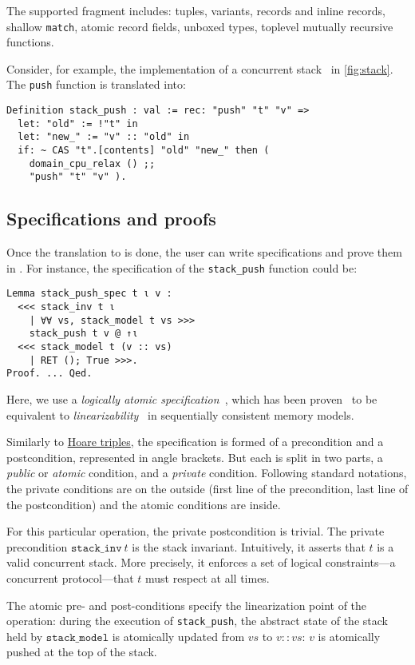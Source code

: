 The supported \OCaml fragment includes: tuples, variants, records and inline records, shallow \texttt{match}, atomic record fields, unboxed types, toplevel mutually recursive functions.

Consider, for example, the \OCaml implementation of a concurrent stack~\cite{thomas1986systems} in \cref{fig:stack}.
The \texttt{push} function is translated into:

\begin{verbatim}
Definition stack_push : val := rec: "push" "t" "v" =>
  let: "old" := !"t" in
  let: "new_" := "v" :: "old" in
  if: ~ CAS "t".[contents] "old" "new_" then (
    domain_cpu_relax () ;;
    "push" "t" "v" ).
\end{verbatim}

\subsection{Specifications and proofs}

Once the translation to \ZooLang is done, the user can write specifications and prove them in \Iris.
For instance, the specification of the \texttt{stack_push} function could be:

\begin{verbatim}
Lemma stack_push_spec t ι v :
  <<< stack_inv t ι
    | ∀∀ vs, stack_model t vs >>>
    stack_push t v @ ↑ι
  <<< stack_model t (v :: vs)
    | RET (); True >>>.
Proof. ... Qed.
\end{verbatim}

Here, we use a \emph{logically atomic specification}~\cite{DBLP:conf/ecoop/PintoDG14}, which has been proven~\cite{DBLP:journals/pacmpl/BirkedalDGJST21} to be equivalent to \emph{linearizability}~\cite{DBLP:journals/toplas/HerlihyW90} in sequentially consistent memory models.

Similarly to \href{https://en.wikipedia.org/wiki/Hoare_logic}{Hoare triples},
the specification is formed of a precondition and a postcondition, represented in angle brackets.
But each is split in two parts, a \emph{public} or \emph{atomic} condition, and a \emph{private} condition.
Following standard \Iris notations, the private conditions are on the outside (first line of the precondition, last line of the postcondition) and the atomic conditions are inside.

For this particular operation, the private postcondition is trivial.
The private precondition $\mathtt{stack\_inv}\ t$ is the stack invariant.
Intuitively, it asserts that $t$ is a valid concurrent stack.
More precisely, it enforces a set of logical constraints---a concurrent protocol---that $t$ must respect at all times.

The atomic pre- and post-conditions specify the linearization point of the operation: during the execution of \texttt{stack\_push}, the abstract state of the stack held by $\mathtt{stack\_model}$ is atomically updated from $\mathit{vs}$ to $v :: \mathit{vs}$: $v$ is atomically pushed at the top of the stack.

